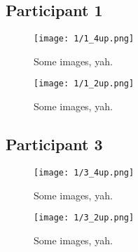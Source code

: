 

\clearpage

\subsection{Participant 1}

\begin{figure}[h]
	\begin{center}
	\texttt{[image: 1/1\_4up.png]}
	\caption{Some images, yah.}
	\end{center}
\end{figure}

\clearpage

\begin{figure}[h]
	\begin{center}
	\texttt{[image: 1/1\_2up.png]}
	\caption{Some images, yah.}
	\end{center}
\end{figure}


\clearpage

\subsection{Participant 3}

\begin{figure}[h]
	\begin{center}
	\texttt{[image: 1/3\_4up.png]}
	\caption{Some images, yah.}
	\end{center}
\end{figure}

\clearpage

\begin{figure}[h]
	\begin{center}
	\texttt{[image: 1/3\_2up.png]}
	\caption{Some images, yah.}
	\end{center}
\end{figure}


\clearpage

